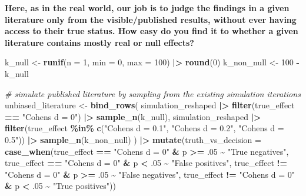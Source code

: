 \documentclass[
]{article}
\newenvironment{Shaded}{\begin{snugshade}}{\end{snugshade}}
\newcommand{\AttributeTok}[1]{\textcolor[rgb]{0.13,0.29,0.53}{#1}}
\newcommand{\CommentTok}[1]{\textcolor[rgb]{0.56,0.35,0.01}{\textit{#1}}}
\newcommand{\DecValTok}[1]{\textcolor[rgb]{0.00,0.00,0.81}{#1}}
\newcommand{\FunctionTok}[1]{\textcolor[rgb]{0.13,0.29,0.53}{\textbf{#1}}}
\newcommand{\NormalTok}[1]{#1}
\newcommand{\OtherTok}[1]{\textcolor[rgb]{0.56,0.35,0.01}{#1}}
\newcommand{\SpecialCharTok}[1]{\textcolor[rgb]{0.81,0.36,0.00}{\textbf{#1}}}
\newcommand{\StringTok}[1]{\textcolor[rgb]{0.31,0.60,0.02}{#1}}
\begin{document}
\textbf{Here, as in the real world, our job is to judge the findings in
a given literature only from the visible/published results, without ever
having access to their true status. How easy do you find it to whether a
given literature contains mostly real or null effects?}

\begin{Shaded}
\begin{Highlighting}[]
\NormalTok{k\_null }\OtherTok{\textless{}{-}} \FunctionTok{runif}\NormalTok{(}\AttributeTok{n =} \DecValTok{1}\NormalTok{, }\AttributeTok{min =} \DecValTok{0}\NormalTok{, }\AttributeTok{max =} \DecValTok{100}\NormalTok{) }\SpecialCharTok{|\textgreater{}} \FunctionTok{round}\NormalTok{(}\DecValTok{0}\NormalTok{)}
\NormalTok{k\_non\_null }\OtherTok{\textless{}{-}} \DecValTok{100} \SpecialCharTok{{-}}\NormalTok{ k\_null}

\CommentTok{\# simulate published literature by sampling from the existing simulation iterations}
\NormalTok{unbiased\_literature }\OtherTok{\textless{}{-}}
  \FunctionTok{bind\_rows}\NormalTok{(}
\NormalTok{    simulation\_reshaped }\SpecialCharTok{|\textgreater{}}
      \FunctionTok{filter}\NormalTok{(true\_effect }\SpecialCharTok{==} \StringTok{"Cohen\textquotesingle{}s d = 0"}\NormalTok{) }\SpecialCharTok{|\textgreater{}}
      \FunctionTok{sample\_n}\NormalTok{(k\_null),}
\NormalTok{    simulation\_reshaped }\SpecialCharTok{|\textgreater{}}
      \FunctionTok{filter}\NormalTok{(true\_effect }\SpecialCharTok{\%in\%} \FunctionTok{c}\NormalTok{(}\StringTok{"Cohen\textquotesingle{}s d = 0.1"}\NormalTok{, }\StringTok{"Cohen\textquotesingle{}s d = 0.2"}\NormalTok{, }\StringTok{"Cohen\textquotesingle{}s d = 0.5"}\NormalTok{)) }\SpecialCharTok{|\textgreater{}}
      \FunctionTok{sample\_n}\NormalTok{(k\_non\_null)}
\NormalTok{  ) }\SpecialCharTok{|\textgreater{}}
  \FunctionTok{mutate}\NormalTok{(}\AttributeTok{truth\_vs\_decision =} \FunctionTok{case\_when}\NormalTok{(true\_effect }\SpecialCharTok{==} \StringTok{"Cohen\textquotesingle{}s d = 0"} \SpecialCharTok{\&}\NormalTok{ p }\SpecialCharTok{\textgreater{}=}\NormalTok{ .}\DecValTok{05} \SpecialCharTok{\textasciitilde{}} \StringTok{"True negatives"}\NormalTok{,}
\NormalTok{                                       true\_effect }\SpecialCharTok{==} \StringTok{"Cohen\textquotesingle{}s d = 0"} \SpecialCharTok{\&}\NormalTok{ p }\SpecialCharTok{\textless{}}\NormalTok{  .}\DecValTok{05} \SpecialCharTok{\textasciitilde{}} \StringTok{"False positives"}\NormalTok{,}
\NormalTok{                                       true\_effect }\SpecialCharTok{!=} \StringTok{"Cohen\textquotesingle{}s d = 0"} \SpecialCharTok{\&}\NormalTok{ p }\SpecialCharTok{\textgreater{}=}\NormalTok{ .}\DecValTok{05} \SpecialCharTok{\textasciitilde{}} \StringTok{"False negatives"}\NormalTok{,}
\NormalTok{                                       true\_effect }\SpecialCharTok{!=} \StringTok{"Cohen\textquotesingle{}s d = 0"} \SpecialCharTok{\&}\NormalTok{ p }\SpecialCharTok{\textless{}}\NormalTok{  .}\DecValTok{05} \SpecialCharTok{\textasciitilde{}} \StringTok{"True positives"}\NormalTok{))}
\end{Highlighting}
\end{Shaded}
\end{document}
